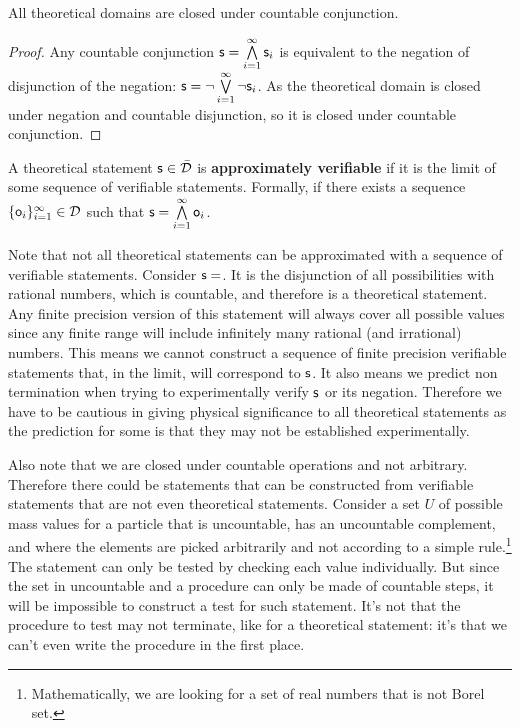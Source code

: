 \documentclass[11pt,letterpaper,fleqn]{memoir} %
\begin{document}
\begin{mathSection}
	\begin{prop}
		All theoretical domains are closed under countable conjunction.
	\end{prop}
	
	\begin{proof}
		Any countable conjunction $\mathsf{s} = \bigwedge\limits_{i=1}^{\infty} \mathsf{s}_i$ is equivalent to the negation of disjunction of the negation: $\mathsf{s} = \neg\bigvee\limits_{i=1}^{\infty} \neg\mathsf{s}_i$. As the theoretical domain is closed under negation and countable disjunction, so it is closed under countable conjunction.  
	\end{proof}

	\begin{defn}\label{def_approximately_verifiable}
		A theoretical statement $\mathsf{s} \in \bar{\mathcal{D}}$ is \textbf{approximately verifiable} if it is the limit of some sequence of verifiable statements. Formally, if there exists a sequence $\{\mathsf{o}_i\}_{i=1}^{\infty} \in \mathcal{D}$ such that $\mathsf{s} = \bigwedge\limits_{i=1}^{\infty} \mathsf{o}_i$.
	\end{defn}
\end{mathSection}

Note that not all theoretical statements can be approximated with a sequence of verifiable statements. Consider $\mathsf{s}=$. It is the disjunction of all possibilities with rational numbers, which is countable, and therefore is a theoretical statement. Any finite precision version of this statement will always cover all possible values since any finite range will include infinitely many rational (and irrational) numbers. This means we cannot construct a sequence of finite precision verifiable statements that, in the limit, will correspond to $\mathsf{s}$. It also means we predict non termination when trying to experimentally verify $\mathsf{s}$ or its negation. Therefore we have to be cautious in giving physical significance to all theoretical statements as the prediction for some is that they may not be established experimentally.

Also note that we are closed under countable operations and not arbitrary. Therefore there could be statements that can be constructed from verifiable statements that are not even theoretical statements. Consider a set $U$ of possible mass values for a particle that is uncountable, has an uncountable complement, and where the elements are picked arbitrarily and not according to a simple rule.\footnote{Mathematically, we are looking for a set of real numbers that is not Borel set.} The statement  can only be tested by checking each value individually. But since the set in uncountable and a procedure can only be made of countable steps, it will be impossible to construct a test for such statement. It's not that the procedure to test may not terminate, like for a theoretical statement: it's that we can't even write the procedure in the first place.
\end{document}

